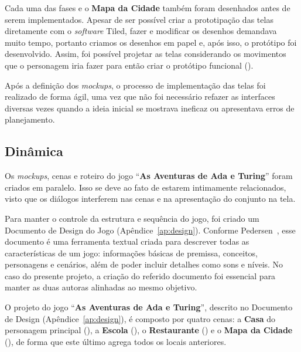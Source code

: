 
Cada uma das fases e o \textbf{Mapa da Cidade} também foram desenhados antes de serem implementados. Apesar de ser possível criar a prototipação das telas diretamente com o \textit{software} Tiled, fazer e modificar os desenhos demandava muito tempo, portanto criamos os desenhos em papel e, após isso, o protótipo foi desenvolvido. Assim, foi possível projetar as telas considerando os movimentos que o personagem iria fazer para então criar o protótipo funcional ().



Após a definição dos \textit{mockups}, o processo de implementação das telas foi realizado de forma ágil, uma vez que não foi necessário refazer as interfaces diversas vezes quando a ideia inicial se mostrava ineficaz ou apresentava erros de planejamento.

\subsection{Dinâmica} \label{ssec:dinamica}

Os \textit{mockups}, cenas e roteiro do jogo “\textbf{As Aventuras de Ada e Turing}” foram criados em paralelo. Isso se deve ao fato de estarem intimamente relacionados, visto que os diálogos interferem nas cenas e na apresentação do conjunto na tela. 

Para manter o controle da estrutura e sequência do jogo, foi criado um Documento de Design do Jogo (Apêndice~\ref{ap:design}). Conforme Pedersen~\cite{pedersen2009game}, esse documento é uma ferramenta textual criada para descrever todas as características de um jogo: informações básicas de premissa, conceitos, personagens e cenários, além de poder incluir detalhes como sons e níveis. No caso do presente projeto, a criação do referido documento foi essencial para manter as duas autoras alinhadas ao mesmo objetivo.

O projeto do jogo “\textbf{As Aventuras de Ada e Turing}”, descrito no Documento de Design (Apêndice~\ref{ap:design}), é composto por quatro cenas: a \textbf{Casa} do personagem principal (), a \textbf{Escola} (), o \textbf{Restaurante} () e o  \textbf{Mapa da Cidade} (), de forma que este último agrega todos os locais anteriores.

